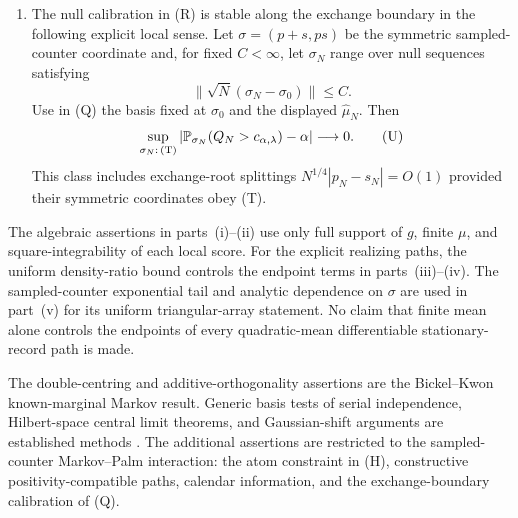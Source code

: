 \begin{theorem}
\begin{enumerate}[label=\textup{(\roman*)}]
\item The null calibration in \textup{(R)} is stable along the exchange
boundary in the following explicit local sense.  Let
$\sigma=(p+s,ps)$ be the symmetric sampled-counter coordinate and, for fixed
$C<\infty$, let $\sigma_N$ range over null sequences satisfying
\[
 \|\sqrt N(\sigma_N-\sigma_0)\|\leq C.
 \tag{T}
\]
Use in \textup{(Q)} the basis fixed at $\sigma_0$ and the displayed
$\widehat\mu_N$.  Then
\[
 \sup_{\sigma_N:\,\textup{(T)}}
 \left|\mathbb P_{\sigma_N}(Q_N>c_{\alpha,\lambda})-\alpha\right|
 \longrightarrow0.
 \tag{U}
\]
This class includes exchange-root splittings
$N^{1/4}|p_N-s_N|=O(1)$ provided their symmetric coordinates obey
\textup{(T)}.
\end{enumerate}

The algebraic assertions in parts~\textup{(i)}--\textup{(ii)} use only full
support of $g$, finite $\mu$, and square-integrability of each local score.
For the explicit realizing paths, the uniform density-ratio bound controls
the endpoint terms in parts~\textup{(iii)}--\textup{(iv)}.  The
sampled-counter exponential tail and analytic dependence on $\sigma$ are used
in part~\textup{(v)} for its uniform triangular-array statement.  No claim
that finite mean alone controls the endpoints of every quadratic-mean
differentiable stationary-record path is made.

The double-centring and additive-orthogonality assertions are the
Bickel--Kwon known-marginal Markov result.  Generic basis tests of serial independence, Hilbert-space central limit
theorems, and Gaussian-shift arguments are established methods
\cite{SkaugTjostheim1993SerialIndependence,
DedeckerMerlevede2003HilbertCLT,vanDerVaart1998AsymptoticStatistics}.
The additional assertions are restricted to the sampled-counter
Markov--Palm interaction: the atom constraint in \textup{(H)}, constructive
positivity-compatible paths, calendar information, and the exchange-boundary
calibration of \textup{(Q)}.
\end{theorem}

